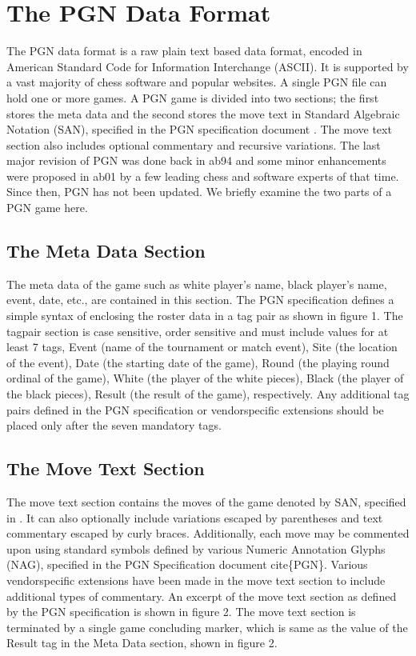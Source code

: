 \documentclass[conference]{IEEEtran}
\begin{document}
\section{The PGN Data Format}

The PGN data format is a raw plain text based data format, encoded in American Standard Code for Information Interchange (ASCII). It is supported by a vast majority of chess software and popular websites. A single PGN file can hold one or more games. A PGN game is divided into two sections; the first stores the meta data and the second stores the move text in Standard Algebraic Notation (SAN), specified in the PGN specification document \cite{ab01}
. The move text section also includes optional commentary and recursive variations. The last major revision of PGN was done back in ab94 and some minor enhancements were proposed in ab01 \cite{ab02}
 by a few leading chess and software experts of that time. Since then, PGN has not been updated. We briefly examine the two parts of a PGN game here.




\subsection{The Meta Data Section}

The meta data of the game such as white player's name, black player's name, event, date, etc., are contained in this section. The PGN specification defines a simple syntax of enclosing the roster data in a tag pair as shown in figure 1. The tag\textendash pair section is case sensitive, order sensitive and must include values for at least 7 tags, Event (name of the tournament or match event), Site (the location of the event), Date (the starting date of the game), Round (the playing round ordinal of the game), White (the player of the white pieces), Black (the player of the black pieces), Result (the result of the game), respectively. Any additional tag pairs defined in the PGN specification or vendor\textendash specific extensions should be placed only after the seven mandatory tags.




\subsection{The Move Text Section}

The move text section contains the moves of the game denoted by SAN, specified in \cite{ab01}
. It can also optionally include variations escaped by parentheses and text commentary escaped by curly braces. Additionally, each move may be commented upon using standard symbols defined by various Numeric Annotation Glyphs (NAG), specified in the PGN Specification document cite\{PGN\}. Various vendor\textendash specific extensions have been made in the move text section to include additional types of commentary. An excerpt of the move text section as defined by the PGN specification is shown in figure 2. The move text section is terminated by a single game concluding marker, which is same as the value of the Result tag in the Meta Data section, shown in figure 2.
\end{document}
